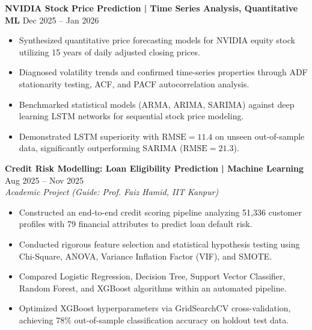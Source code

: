 \documentclass[10pt]{article}
\begin{document}
\vspace{6pt}

\textbf{NVIDIA Stock Price Prediction | Time Series Analysis, Quantitative ML} \hfill Dec 2025 -- Jan 2026
\begin{itemize}[noitemsep, topsep=2pt, partopsep=0pt, parsep=1.5pt]
    \item Synthesized quantitative price forecasting models for NVIDIA equity stock utilizing 15 years of daily adjusted closing prices.
    \item Diagnosed volatility trends and confirmed time-series properties through ADF stationarity testing, ACF, and PACF autocorrelation analysis.
    \item Benchmarked statistical models (ARMA, ARIMA, SARIMA) against deep learning LSTM networks for sequential stock price modeling.
    \item Demonstrated LSTM superiority with $\text{RMSE} = 11.4$ on unseen out-of-sample data, significantly outperforming SARIMA ($\text{RMSE} = 21.3$).
\end{itemize}

\vspace{6pt}

\textbf{Credit Risk Modelling: Loan Eligibility Prediction | Machine Learning} \hfill Aug 2025 -- Nov 2025\\
\textit{Academic Project (Guide: Prof. Faiz Hamid, IIT Kanpur)}
\begin{itemize}[noitemsep, topsep=2pt, partopsep=0pt, parsep=1.5pt]
    \item Constructed an end-to-end credit scoring pipeline analyzing 51,336 customer profiles with 79 financial attributes to predict loan default risk.
    \item Conducted rigorous feature selection and statistical hypothesis testing using Chi-Square, ANOVA, Variance Inflation Factor (VIF), and SMOTE.
    \item Compared Logistic Regression, Decision Tree, Support Vector Classifier, Random Forest, and XGBoost algorithms within an automated pipeline.
    \item Optimized XGBoost hyperparameters via GridSearchCV cross-validation, achieving 78\% out-of-sample classification accuracy on holdout test data.
\end{itemize}

\vspace{6pt}
\end{document}
